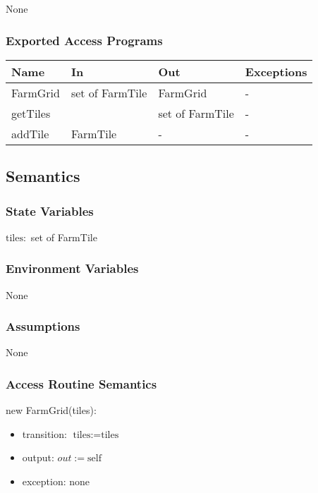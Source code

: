 \documentclass[12pt, titlepage]{article}
\begin{document}
None

\subsubsection{Exported Access Programs}

\begin{center}
\begin{tabular}{p{2cm} p{4cm} p{4cm} p{2cm}}
\hline
\textbf{Name} & \textbf{In} & \textbf{Out} & \textbf{Exceptions} \\
\hline
FarmGrid & set of FarmTile & FarmGrid & - \\
\hline
getTiles & & set of FarmTile & - \\
\hline
addTile & FarmTile & - & - \\
\hline
\end{tabular}
\end{center}

\subsection{Semantics}

\subsubsection{State Variables}

$\text{tiles} :$ set of FarmTile

\subsubsection{Environment Variables}

None

\subsubsection{Assumptions}

None

\subsubsection{Access Routine Semantics}

\noindent new FarmGrid(tiles):
\begin{itemize}
\item transition: $\text{tiles} := \text{tiles}$
\item output: $out := \text{self}$
\item exception: none
\end{itemize}
\end{document}
